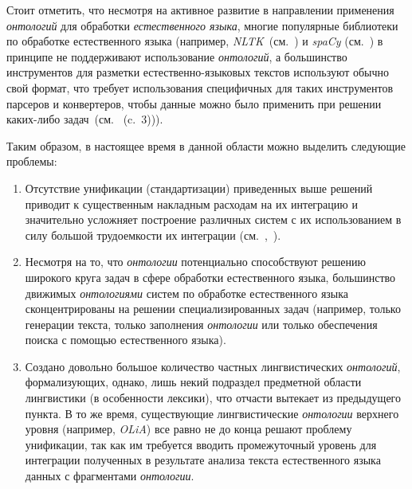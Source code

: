 Стоит отметить, что несмотря на активное развитие в направлении применения \textit{онтологий} для обработки \textit{естественного языка}, многие популярные библиотеки по обработке естественного языка (например, \textit{NLTK}~(см.~) и \textit{spaCy} (см.~) в принципе не поддерживают использование \textit{онтологий}, а большинство инструментов для разметки естественно-языковых текстов используют обычно свой формат, что требует использования специфичных для таких инструментов парсеров и конвертеров, чтобы данные можно было применить при решении каких-либо задач~(см.~ (c.~3))).

Таким образом, в настоящее время в данной области можно выделить следующие проблемы:
\begin{enumerate}
    \item Отсутствие унификации (стандартизации) приведенных выше решений приводит к существенным накладным расходам на их интеграцию и значительно усложняет построение различных систем с их использованием в силу большой трудоемкости их интеграции (см.~,~).
    \item Несмотря на то, что \textit{онтологии} потенциально способствуют решению широкого круга задач в сфере обработки естественного языка, большинство движимых \textit{онтологиями} систем по обработке естественного языка сконцентрированы на решении специализированных задач (например, только генерации текста, только заполнения \textit{онтологии} или только обеспечения поиска с помощью естественного языка).
    \item Создано довольно большое количество частных лингвистических \textit{онтологий}, формализующих, однако, лишь некий подраздел предметной области лингвистики (в особенности лексики), что отчасти вытекает из предыдущего пункта.
    В то же время, существующие лингвистические \textit{онтологии} верхнего уровня (например, \textit{OLiA}) все равно не до конца решают проблему унификации, так как им требуется вводить промежуточный уровень для интеграции полученных в результате анализа текста естественного языка данных с фрагментами \textit{онтологии}.
\end{enumerate}

